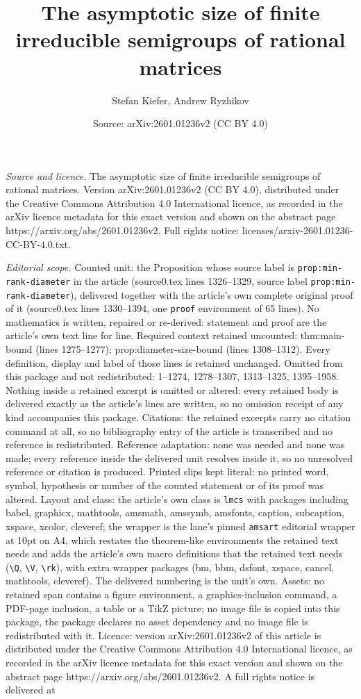 \documentclass[10pt,a4paper]{amsart}
\title[The asymptotic size of finite irreducible semigroups of rati]{The asymptotic size of finite irreducible semigroups of rational matrices}
\author{Stefan Kiefer, Andrew Ryzhikov}
\date{Source: arXiv:2601.01236v2 (CC BY 4.0)}
\begin{document}
\maketitle

\noindent\emph{Source and licence.} The asymptotic size of finite irreducible semigroups of rational matrices. Version arXiv:2601.01236v2 (CC BY 4.0), distributed under the Creative Commons Attribution 4.0 International licence, as recorded in the arXiv licence metadata for this exact version and shown on the abstract page https://arxiv.org/abs/2601.01236v2. Full rights notice: licenses/arxiv-2601.01236-CC-BY-4.0.txt.\par\smallskip

\noindent\textit{Editorial scope.} Counted unit: the Proposition whose source label is \texttt{prop:min-rank-diameter} in the article (source0.tex lines 1326--1329, source label \texttt{prop:min-rank-diameter}), delivered together with the article's own complete original proof of it (source0.tex lines 1330--1394, one \texttt{proof} environment of 65 lines). No mathematics is written, repaired or re-derived: statement and proof are the article's own text line for line. Required context retained uncounted: thm:main-bound (lines 1275--1277); prop:diameter-size-bound (lines 1308--1312). Every definition, display and label of those lines is retained unchanged. Omitted from this package and not redistributed: 1--1274, 1278--1307, 1313--1325, 1395--1958. Nothing inside a retained excerpt is omitted or altered: every retained body is delivered exactly as the article's lines are written, so no omission receipt of any kind accompanies this package. Citations: the retained excerpts carry no citation command at all, so no bibliography entry of the article is transcribed and no reference is redistributed. Reference adaptation: none was needed and none was made; every reference inside the delivered unit resolves inside it, so no unresolved reference or citation is produced. Printed slips kept literal: no printed word, symbol, hypothesis or number of the counted statement or of its proof was altered. Layout and class: the article's own class is \texttt{lmcs} with packages including babel, graphicx, mathtools, amsmath, amssymb, amsfonts, caption, subcaption, xspace, xcolor, cleveref; the wrapper is the lane's pinned \texttt{amsart} editorial wrapper at 10pt on A4, which restates the theorem-like environments the retained text needs and adds the article's own macro definitions that the retained text needs (\texttt{\textbackslash Q}, \texttt{\textbackslash V}, \texttt{\textbackslash rk}), with extra wrapper packages (bm, bbm, dsfont, xspace, cancel, mathtools, cleveref). The delivered numbering is the unit's own. Assets: no retained span contains a figure environment, a graphics-inclusion command, a PDF-page inclusion, a table or a TikZ picture; no image file is copied into this package, the package declares no asset dependency and no image file is redistributed with it. Licence: version arXiv:2601.01236v2 of this article is distributed under the Creative Commons Attribution 4.0 International licence, as recorded in the arXiv licence metadata for this exact version and shown on the abstract page https://arxiv.org/abs/2601.01236v2. A full rights notice is delivered at 
\end{document}
